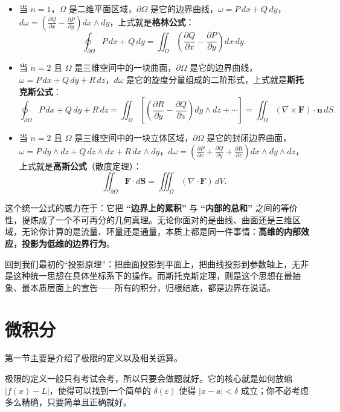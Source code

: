\documentclass[UTF8]{ctexbook}
\begin{document}
\begin{itemize}
    \item 当 $n=1$，$\Omega$ 是二维平面区域，$\partial \Omega$ 是它的边界曲线，$\omega = P\,dx + Q\,dy$，$d\omega = \left( \frac{\partial Q}{\partial x} - \frac{\partial P}{\partial y} \right) dx \wedge dy$，上式就是\textbf{格林公式}：
    \[
    \oint_{\partial \Omega} P\,dx + Q\,dy = \iint_{\Omega} \left( \frac{\partial Q}{\partial x} - \frac{\partial P}{\partial y} \right) dx\,dy.
    \]

    \item 当 $n=2$ 且 $\Omega$ 是三维空间中的一块曲面，$\partial \Omega$ 是它的边界曲线，$\omega = P\,dx + Q\,dy + R\,dz$，$d\omega$ 是它的旋度分量组成的二阶形式，上式就是\textbf{斯托克斯公式}：
    \[
    \oint_{\partial \Omega} P\,dx + Q\,dy + R\,dz = \iint_{\Omega} \left[ \left( \frac{\partial R}{\partial y} - \frac{\partial Q}{\partial z} \right) dy\wedge dz + \cdots \right] = \iint_{\Omega} (\nabla \times \mathbf{F}) \cdot \mathbf{n} \, dS.
    \]

    \item 当 $n=2$ 且 $\Omega$ 是三维空间中的一块立体区域，$\partial \Omega$ 是它的封闭边界曲面，$\omega = P\,dy\wedge dz + Q\,dz\wedge dx + R\,dx\wedge dy$，$d\omega = \left( \frac{\partial P}{\partial x} + \frac{\partial Q}{\partial y} + \frac{\partial R}{\partial z} \right) dx\wedge dy\wedge dz$，上式就是\textbf{高斯公式}（散度定理）：
    \[
    \iint_{\partial \Omega} \mathbf{F} \cdot d\mathbf{S} = \iiint_{\Omega} (\nabla \cdot \mathbf{F}) \, dV.
    \]
\end{itemize}

这个统一公式的威力在于：它把 \textbf{“边界上的累积”} 与 \textbf{“内部的总和”} 之间的等价性，提炼成了一个不可再分的几何真理。无论你面对的是曲线、曲面还是三维区域，无论你计算的是流量、环量还是通量，本质上都是同一件事情：\textbf{高维的内部效应，投影为低维的边界行为}。

回到我们最初的“投影原理”：把曲面投影到平面上，把曲线投影到参数轴上，无非是这种统一思想在具体坐标系下的操作。而斯托克斯定理，则是这个思想在最抽象、最本质层面上的宣告——所有的积分，归根结底，都是边界在说话。

\chapter{微积分}

第一节主要是介绍了极限的定义以及相关运算。

极限的定义一般只有考试会考，所以只要会做题就好。它的核心就是如何放缩 $|f(x)-L|$，使得可以找到一个简单的 $\delta(\varepsilon)$ 使得 $|x-a|<\delta$ 成立；你不必考虑多么精确，只要简单且正确就好。
\end{document}
